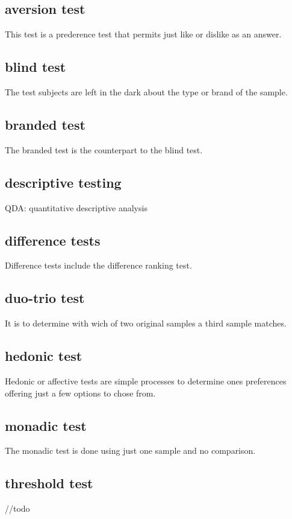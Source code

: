 \documentclass[]{scrartcl}
\begin{document}
\subsection{aversion test}
This test is a prederence test that permits just like or dislike as an answer.

\subsection{blind test}
The test subjects are left in the dark about the type or brand of the sample.

\subsection{branded test}
The branded test is the counterpart to the blind test.

\subsection{descriptive testing}
QDA: quantitative descriptive analysis

\subsection{difference tests}
Difference tests include the difference ranking test.

\subsection{duo-trio test}
It is to determine with wich of two original samples a third sample matches.

\subsection{hedonic test}
Hedonic or affective tests are simple processes to determine ones preferences offering
just a few options to chose from.

\subsection{monadic test}
The monadic test is done using just one sample and no comparison.

\subsection{threshold test}
//todo
\end{document}
